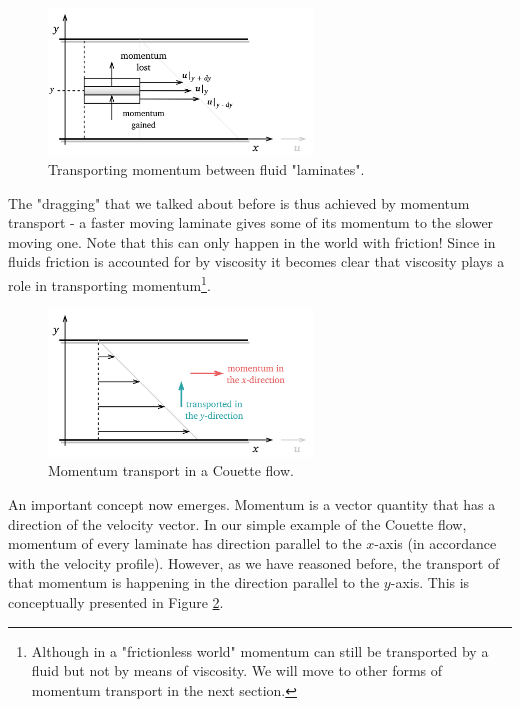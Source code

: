 \documentclass[10pt,twocolumn]{article}
\begin{document}
\begin{figure}[H]
\centering\includegraphics[width=7cm]{momentum-transport-in-laminates.png}
\caption{Transporting momentum between fluid "laminates".}
\label{fig:momentum-transport-in-laminates}
\end{figure}
The "dragging" that we talked about before is thus achieved by momentum transport - a faster moving laminate gives some of its momentum to the slower moving one. Note that this can only happen in the world with friction! Since in fluids friction is accounted for by viscosity it becomes clear that viscosity plays a role in transporting momentum\footnote{Although in a "frictionless world" momentum can still be transported by a fluid but not by means of viscosity. We will move to other forms of momentum transport in the next section.}.
\begin{figure}[H]
\centering\includegraphics[width=7cm]{couette-flow-momentum-transport.png}
\caption{Momentum transport in a Couette flow.}
\label{fig:couette-flow-momentum-transport}
\end{figure}
An important concept now emerges. Momentum is a vector quantity that has a direction of the velocity vector. In our simple example of the Couette flow, momentum of every laminate has direction parallel to the $x$-axis (in accordance with the velocity profile). However, as we have reasoned before, the transport of that momentum is happening in the direction parallel to the $y$-axis. This is conceptually presented in Figure \ref{fig:couette-flow-momentum-transport}. 
\end{document}
